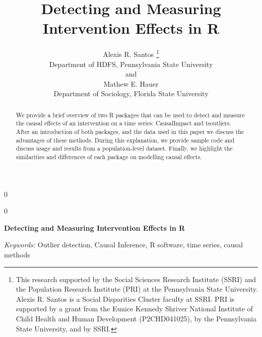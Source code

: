 \documentclass[12pt]{article}
\newcommand{\blind}{0}
\begin{document}
\def\spacingset#1{\renewcommand{\baselinestretch}%
{#1}\small\normalsize} \spacingset{1}



\blind
{
  \title{\bf Detecting and Measuring Intervention Effects in R}

  \author{
        Alexis R. Santos \thanks{This research supported by the Social
Sciences Research Institute (SSRI) and the Population Research Institute
(PRI) at the Pennsylvania State University. Alexis R. Santos is a Social
Disparities Cluster faculty at SSRI. PRI is supported by a grant from
the Eunice Kennedy Shriver National Institute of Child Health and Human
Development (P2CHD041025), by the Pennsylvania State University, and by
SSRI.} \\
    Department of HDFS, Pennsylvania State University\\
     and \\     Mathew E. Hauer \\
    Department of Sociology, Florida State University\\
      }
  \maketitle
} \fi

\blind
{
  \bigskip
  \bigskip
  \bigskip
  \begin{center}
    {\LARGE\bf Detecting and Measuring Intervention Effects in R}
  \end{center}
  \medskip
} \fi

\bigskip
\begin{abstract}
We provide a brief overview of two R packages that can be used to detect
and measure the causal effects of an intervention on a time series:
\textsf{CausalImpact} and \textsf{tsoutliers}. After an introduction of
both packages, and the data used in this paper we discuss the advantages
of these methods. During this explanation, we provide sample code and
discuss usage and results from a population-level dataset. Finally, we
highlight the similarities and differences of each package on modelling
causal effects.
\end{abstract}

\noindent%
{\it Keywords:} Outlier detection, Causal Inference, R software, time
series, causal methods
\vfill

\newpage
\spacingset{1.45} %
\end{document}
